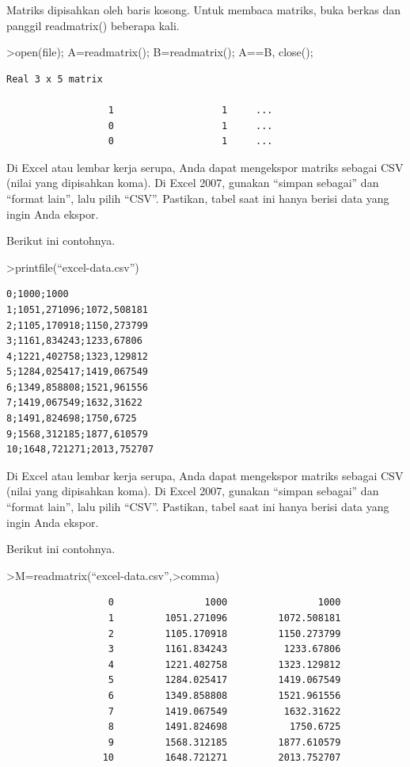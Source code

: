 \documentclass[
]{book}
\begin{document}
Matriks dipisahkan oleh baris kosong. Untuk membaca matriks, buka berkas dan panggil readmatrix() beberapa kali.

\textgreater open(file); A=readmatrix(); B=readmatrix(); A==B, close();

\begin{verbatim}
Real 3 x 5 matrix

                  1                   1     ...
                  0                   1     ...
                  0                   1     ...
\end{verbatim}

Di Excel atau lembar kerja serupa, Anda dapat mengekspor matriks sebagai CSV (nilai yang dipisahkan koma). Di Excel 2007, gunakan ``simpan sebagai'' dan ``format lain'', lalu pilih ``CSV''. Pastikan, tabel saat ini hanya berisi data yang ingin Anda ekspor.

Berikut ini contohnya.

\textgreater printfile(``excel-data.csv'')

\begin{verbatim}
0;1000;1000
1;1051,271096;1072,508181
2;1105,170918;1150,273799
3;1161,834243;1233,67806
4;1221,402758;1323,129812
5;1284,025417;1419,067549
6;1349,858808;1521,961556
7;1419,067549;1632,31622
8;1491,824698;1750,6725
9;1568,312185;1877,610579
10;1648,721271;2013,752707
\end{verbatim}

Di Excel atau lembar kerja serupa, Anda dapat mengekspor matriks sebagai CSV (nilai yang dipisahkan koma). Di Excel 2007, gunakan ``simpan sebagai'' dan ``format lain'', lalu pilih ``CSV''. Pastikan, tabel saat ini hanya berisi data yang ingin Anda ekspor.

Berikut ini contohnya.

\textgreater M=readmatrix(``excel-data.csv'',\textgreater comma)

\begin{verbatim}
                  0                1000                1000 
                  1         1051.271096         1072.508181 
                  2         1105.170918         1150.273799 
                  3         1161.834243          1233.67806 
                  4         1221.402758         1323.129812 
                  5         1284.025417         1419.067549 
                  6         1349.858808         1521.961556 
                  7         1419.067549          1632.31622 
                  8         1491.824698           1750.6725 
                  9         1568.312185         1877.610579 
                 10         1648.721271         2013.752707 
\end{verbatim}
\end{document}
